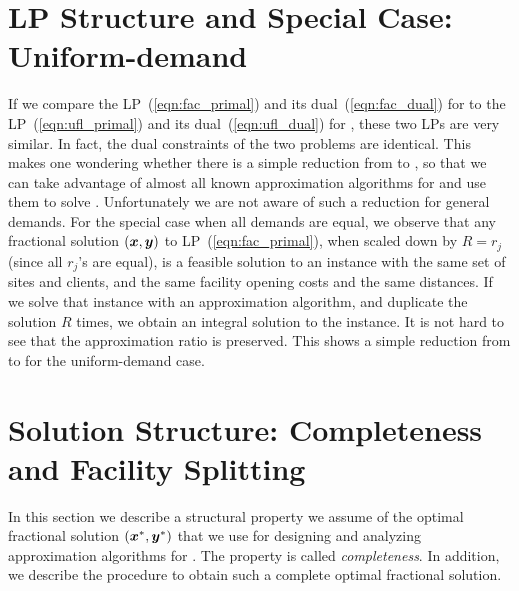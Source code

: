 \documentclass[oneside,final]{ucr}
\begin{document}

\section{LP Structure and Special Case: Uniform-demand}
If we compare the LP~(\ref{eqn:fac_primal}) and its
dual~(\ref{eqn:fac_dual}) for {\FTFP} to the
LP~(\ref{eqn:ufl_primal}) and its dual~(\ref{eqn:ufl_dual})
for {\UFL}, these two LPs are very similar. In fact, the
dual constraints of the two problems are identical. This
makes one wondering whether there is a simple reduction from
{\FTFP} to {\UFL}, so that we can take advantage of almost
all known approximation algorithms for {\UFL} and use them
to solve {\FTFP}. Unfortunately we are not aware of such a
reduction for general demands. For the special case when all
demands are equal, we observe that any fractional solution
$(\boldsymbol{x},\boldsymbol{y})$ to LP~(\ref{eqn:fac_primal}), when scaled down
by $R = r_j$ (since all $r_j$'s are equal), is a feasible
solution to an {\UFL} instance with the same set of sites
and clients, and the same facility opening costs and the
same distances. If we solve that {\UFL} instance with an
approximation algorithm, and duplicate the solution $R$
times, we obtain an integral solution to the {\FTFP}
instance. It is not hard to see that the approximation ratio
is preserved. This shows a simple reduction from {\FTFP} to
{\UFL} for the uniform-demand case.

\section{Solution Structure: Completeness and Facility
  Splitting}
In this section we describe a structural property we assume
of the optimal fractional solution $(\boldsymbol{x}^\ast, \boldsymbol{y}^\ast)$
that we use for designing and analyzing approximation
algorithms for {\FTFP}. The property is called
\emph{completeness}. In addition, we describe the procedure
to obtain such a complete optimal fractional solution.
\end{document}
